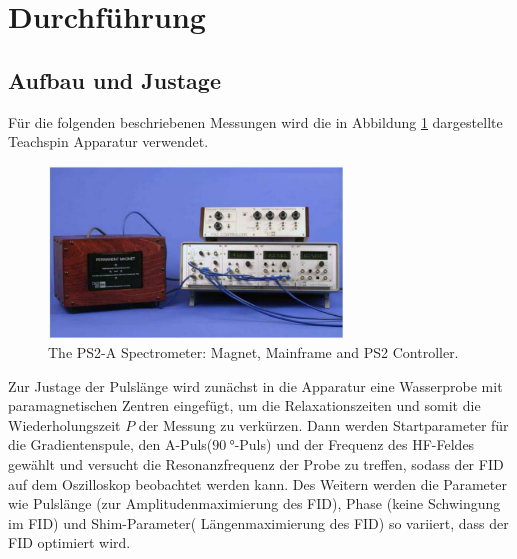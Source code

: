 \newpage
\section{Durchführung}
\label{sec:Durchführung}
\subsection{Aufbau und Justage}
Für die folgenden beschriebenen
Messungen wird die in Abbildung \ref{fig:teachspin}
dargestellte Teachspin Apparatur verwendet.
\FloatBarrier
\begin{figure}
  \includegraphics[width=0.7\textwidth]{teachspin.PNG}
  \caption{The PS2-A Spectrometer: Magnet, Mainframe and PS2 Controller.\cite{sample}}
  \label{fig:teachspin}
\end{figure}
\FloatBarrier
Zur Justage der Pulslänge wird zunächst
in die Apparatur eine Wasserprobe
mit paramagnetischen Zentren eingefügt, um
die Relaxationszeiten und somit die Wiederholungszeit $P$ der Messung zu verkürzen.
Dann werden Startparameter
für die Gradientenspule,
den A-Puls($\SI{90}{\degree}$-Puls)
und der Frequenz des HF-Feldes gewählt
und versucht die Resonanzfrequenz der Probe
zu treffen, sodass der FID auf dem Oszilloskop beobachtet werden kann. Des Weitern werden die
Parameter wie Pulslänge (zur Amplitudenmaximierung des FID), Phase (keine Schwingung im FID) und Shim-Parameter( Längenmaximierung des FID) so variiert, dass
der FID optimiert wird.
